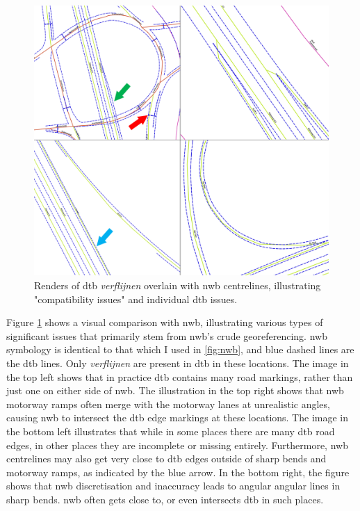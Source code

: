 \begin{figure}
    \centering
    \includegraphics[width=\linewidth]{final_report/figs/dtb_sample_07.png} 
    \caption{Renders of \ac{dtb} \textit{verflijnen} overlain with \ac{nwb} centrelines, illustrating "compatibility issues" and individual \ac{dtb} issues.}
    \label{fig:dtbnwb}
\end{figure}

Figure \ref{fig:dtbnwb} shows a visual comparison with \ac{nwb}, illustrating various types of significant issues that primarily stem from \ac{nwb}'s crude georeferencing. \ac{nwb} symbology is identical to that which I used in \ref{fig:nwb}, and blue dashed lines are the \ac{dtb} lines. Only \textit{verflijnen} are present in \ac{dtb} in these locations. The image in the top left shows that in practice \ac{dtb} contains many road markings, rather than just one on either side of \ac{nwb}. The illustration in the top right shows that \ac{nwb} motorway ramps often merge with the motorway lanes at unrealistic angles, causing \ac{nwb} to intersect the \ac{dtb} edge markings at these locations. The image in the bottom left illustrates that while in some places there are many \ac{dtb} road edges, in other places they are incomplete or missing entirely. Furthermore, \ac{nwb} centrelines may also get very close to \ac{dtb} edges outside of sharp bends and motorway ramps, as indicated by the blue arrow. In the bottom right, the figure shows that \ac{nwb} discretisation and inaccuracy leads to angular angular lines in sharp bends. \ac{nwb} often gets close to, or even intersects \ac{dtb} in such places.

